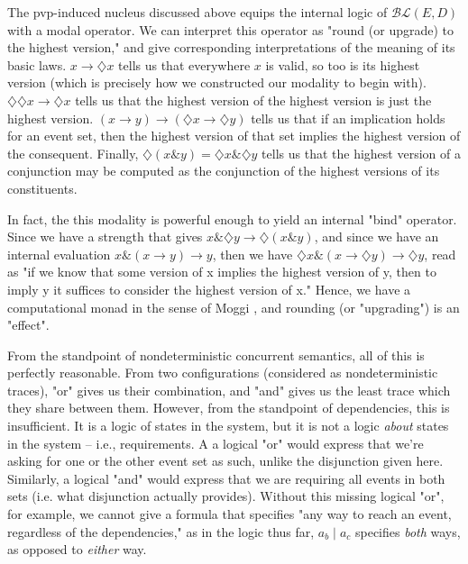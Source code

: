 \documentclass[hoptionsi,review,format=acmsmall]{acmart}
\theoremstyle{definition}
\newcommand{\BLc}{\mathcal{BL}}
\newcommand{\band}{\mathbin{\&}}
\newcommand{\bor}{\mathbin{|}}
\newcommand{\Dia}{\diamondsuit}
\begin{document}

The pvp-induced nucleus discussed above equips the internal logic of \(\BLc(E,D)\) with a modal operator. We can interpret this operator as "round (or upgrade) to the highest version," and give corresponding interpretations of the meaning of its basic laws. \(x \rightarrow \Dia{x}\) tells us that everywhere \(x\) is valid, so too is its highest version (which is precisely how we constructed our modality to begin with). \(\Dia\Dia{x} \rightarrow \Dia{x}\) tells us that the highest version of the highest version is just the highest version. \((x \rightarrow y) \rightarrow (\Dia{x} \rightarrow \Dia{y})\)  tells us that if an implication holds for an event set, then the highest version of that set implies the highest version of the consequent. Finally, \(\Dia(x \band y) = \Dia{x} \band \Dia{y}\) tells us that the highest version of a conjunction may be computed as the conjunction of the highest versions of its constituents.

In fact, the this modality is powerful enough to yield an internal "bind" operator. Since we have a strength that gives \(x \band \Dia{y} \rightarrow \Dia(x \band y)\), and since we have an internal evaluation \(x \band (x \rightarrow y) \rightarrow y\), then we have \(\Dia{x} \band (x \rightarrow \Dia{y}) \rightarrow \Dia{y}\), read as "if we know that some version of x implies the highest version of y, then to imply y it suffices to consider the highest version of x." Hence, we have a computational monad in the sense of Moggi \cite{moggi1991notions}, and rounding (or "upgrading") is an "effect".


From the standpoint of nondeterministic concurrent semantics, all of this is perfectly reasonable. From two configurations (considered as nondeterministic traces), "or" gives us their combination, and "and" gives us the least trace which they share between them. However, from the standpoint of dependencies, this is insufficient. It is a logic of states in the system, but it is not a logic \textit{about} states in the system -- i.e., requirements. A a logical "or"  would express that we're asking for one or the other event set as such, unlike the disjunction given here. Similarly, a logical "and" would express that we are requiring all events in both sets (i.e. what disjunction actually provides). Without this missing logical "or", for example, we cannot give a formula that specifies "any way to reach an event, regardless of the dependencies," as in the logic thus far, \(a_b \bor a_c\) specifies \textit{both} ways, as opposed to \textit{either} way.
\end{document}
